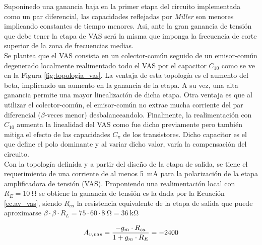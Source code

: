 	Suponinedo una ganancia baja en la primer etapa del circuito implementada como un par diferencial, las capacidades reflejadas por \emph{Miller} son menores implicando constantes de tiempo menores. Asi, ante la gran ganancia de tensión que debe tener la etapa de VAS será la misma que imponga la frecuencia de corte superior de la zona de frecuencias medias.\\
	\indent Se plantea que el VAS consista en un colector-común seguido de un emisor-común degenerado localmente realimentado todo el VAS por el capacitor $C_{10}$ como se ve en la Figura \ref{fig:topologia_vas}. La ventaja de esta topología es el aumento del beta, implicando un aumento en la ganancia de la etapa. A su vez, una alta ganancia permite una mayor linealización de dicha etapa. Otra ventaja es que al utilizar el colector-común, el emisor-común no extrae mucha corriente del par diferencial ($\beta$-veces menor) desbalanceandolo. Finalmente, la realimentación con $C_{10}$ aumenta la linealidad del VAS como fue dicho previamente pero también mitiga el efecto de las capacidades $C_{\pi}$ de los transistores. Dicho capacitor es el que define el polo dominante y al variar dicho valor, varía la compensación del circuito.\\

	Con la topología definida y a partir del diseño de la etapa de salida, se tiene el requerimiento de una corriente de al menos \SI{5}{\milli\ampere} para la polarización de la etapa amplificadora de tensión (VAS). Proponiendo una realimentación local con $R_E = \SI{10}{\ohm}$ se obtiene la ganancia de tensión es la dada por la Ecuación \eqref{ec.av_vas}, siendo $R_{ca}$ la resistencia equivalente de la etapa de salida que puede aproximarse $\beta \cdot \beta \cdot R_L = 75 \cdot 60 \cdot \SI{8}{\ohm} = \SI{36}{\kilo\ohm}$

\begin{equation}
	\centering
	A_{v,vas} = \frac{-g_m \cdot R_{ca}}{1+g_m \cdot R_E} = -2400
	\label{ec.av_vas}
\end{equation}
	
